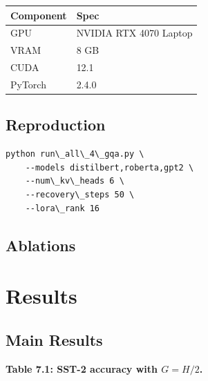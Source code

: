 \begin{table}[H]
\centering
\small
\begin{tabular}{ll}
\toprule
\textbf{Component} & \textbf{Spec} \\
\midrule
GPU & NVIDIA RTX 4070 Laptop \\
VRAM & 8 GB \\
CUDA & 12.1 \\
PyTorch & 2.4.0 \\
\bottomrule
\end{tabular}
\end{table}

\subsection{Reproduction}

\begin{lstlisting}
python run\_all\_4\_gqa.py \
    --models distilbert,roberta,gpt2 \
    --num\_kv\_heads 6 \
    --recovery\_steps 50 \
    --lora\_rank 16
\end{lstlisting}

\subsection{Ablations}



\section{Results}

\subsection{Main Results}

\textbf{Table 7.1: SST-2 accuracy with $G = H/2$.}

